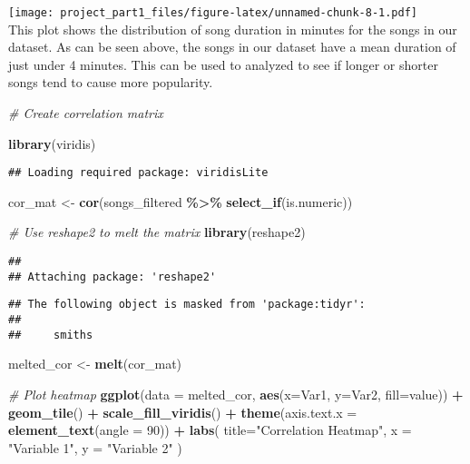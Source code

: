 \documentclass[
]{article}
\newenvironment{Shaded}{\begin{snugshade}}{\end{snugshade}}
\newcommand{\AttributeTok}[1]{\textcolor[rgb]{0.13,0.29,0.53}{#1}}
\newcommand{\CommentTok}[1]{\textcolor[rgb]{0.56,0.35,0.01}{\textit{#1}}}
\newcommand{\DecValTok}[1]{\textcolor[rgb]{0.00,0.00,0.81}{#1}}
\newcommand{\FunctionTok}[1]{\textcolor[rgb]{0.13,0.29,0.53}{\textbf{#1}}}
\newcommand{\NormalTok}[1]{#1}
\newcommand{\OtherTok}[1]{\textcolor[rgb]{0.56,0.35,0.01}{#1}}
\newcommand{\SpecialCharTok}[1]{\textcolor[rgb]{0.81,0.36,0.00}{\textbf{#1}}}
\newcommand{\StringTok}[1]{\textcolor[rgb]{0.31,0.60,0.02}{#1}}
\begin{document}
\texttt{[image: project\_part1\_files/figure-latex/unnamed-chunk-8-1.pdf]}\\
This plot shows the distribution of song duration in minutes for the
songs in our dataset. As can be seen above, the songs in our dataset
have a mean duration of just under 4 minutes. This can be used to
analyzed to see if longer or shorter songs tend to cause more
popularity.

\begin{Shaded}
\begin{Highlighting}[]
\CommentTok{\# Create correlation matrix}

\FunctionTok{library}\NormalTok{(viridis)}
\end{Highlighting}
\end{Shaded}

\begin{verbatim}
## Loading required package: viridisLite
\end{verbatim}

\begin{Shaded}
\begin{Highlighting}[]
\NormalTok{cor\_mat }\OtherTok{\textless{}{-}} \FunctionTok{cor}\NormalTok{(songs\_filtered }\SpecialCharTok{\%\textgreater{}\%} 
                \FunctionTok{select\_if}\NormalTok{(is.numeric))}

\CommentTok{\# Use reshape2 to melt the matrix}
\FunctionTok{library}\NormalTok{(reshape2)}
\end{Highlighting}
\end{Shaded}

\begin{verbatim}
## 
## Attaching package: 'reshape2'
\end{verbatim}

\begin{verbatim}
## The following object is masked from 'package:tidyr':
## 
##     smiths
\end{verbatim}

\begin{Shaded}
\begin{Highlighting}[]
\NormalTok{melted\_cor }\OtherTok{\textless{}{-}} \FunctionTok{melt}\NormalTok{(cor\_mat) }

\CommentTok{\# Plot heatmap}
\FunctionTok{ggplot}\NormalTok{(}\AttributeTok{data =}\NormalTok{ melted\_cor, }\FunctionTok{aes}\NormalTok{(}\AttributeTok{x=}\NormalTok{Var1, }\AttributeTok{y=}\NormalTok{Var2, }\AttributeTok{fill=}\NormalTok{value)) }\SpecialCharTok{+} 
  \FunctionTok{geom\_tile}\NormalTok{() }\SpecialCharTok{+}
  \FunctionTok{scale\_fill\_viridis}\NormalTok{() }\SpecialCharTok{+}
  \FunctionTok{theme}\NormalTok{(}\AttributeTok{axis.text.x =} \FunctionTok{element\_text}\NormalTok{(}\AttributeTok{angle =} \DecValTok{90}\NormalTok{)) }\SpecialCharTok{+}
  \FunctionTok{labs}\NormalTok{(}
    \AttributeTok{title=}\StringTok{"Correlation Heatmap"}\NormalTok{,}
    \AttributeTok{x =} \StringTok{"Variable 1"}\NormalTok{,}
    \AttributeTok{y =} \StringTok{"Variable 2"}
\NormalTok{  ) }
\end{Highlighting}
\end{Shaded}
\end{document}
